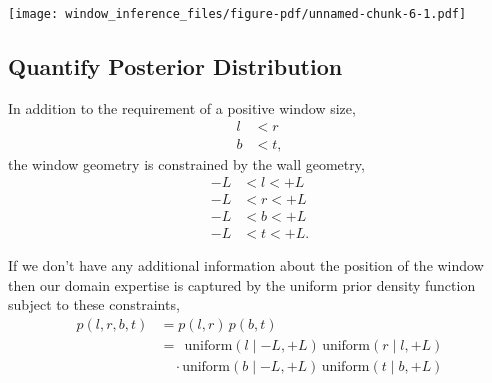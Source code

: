 \documentclass[
  letterpaper,
  DIV=11,
  numbers=noendperiod]{scrartcl}
\newenvironment{Shaded}{\begin{snugshade}}{\end{snugshade}}
\newcommand{\AttributeTok}[1]{\textcolor[rgb]{0.40,0.45,0.13}{#1}}
\newcommand{\ConstantTok}[1]{\textcolor[rgb]{0.56,0.35,0.01}{#1}}
\newcommand{\DecValTok}[1]{\textcolor[rgb]{0.68,0.00,0.00}{#1}}
\newcommand{\FunctionTok}[1]{\textcolor[rgb]{0.28,0.35,0.67}{#1}}
\newcommand{\NormalTok}[1]{\textcolor[rgb]{0.00,0.23,0.31}{#1}}
\newcommand{\OtherTok}[1]{\textcolor[rgb]{0.00,0.23,0.31}{#1}}
\newcommand{\SpecialCharTok}[1]{\textcolor[rgb]{0.37,0.37,0.37}{#1}}
\newcommand{\StringTok}[1]{\textcolor[rgb]{0.13,0.47,0.30}{#1}}
\begin{document}
\begin{Shaded}
\end{Shaded}

\texttt{[image: window\_inference\_files/figure-pdf/unnamed-chunk-6-1.pdf]}

\subsection{Quantify Posterior
Distribution}\label{quantify-posterior-distribution}

In addition to the requirement of a positive window size, \begin{align*}
l &< r
\\
b &< t,
\end{align*} the window geometry is constrained by the wall geometry,
\begin{align*}
-L &< l < +L
\\
-L &< r < +L
\\
-L &< b < +L
\\
-L &< t < +L.
\end{align*}

If we don't have any additional information about the position of the
window then our domain expertise is captured by the uniform prior
density function subject to these constraints, \begin{align*}
p(l, r, b, t)
&=
p(l, r) \, p(b, t)
\\
&=\;\,
\text{uniform}(l \mid -L, +L) \, \text{uniform}(r \mid l, +L)
\\
&\quad \cdot
\text{uniform}(b \mid -L, +L) \, \text{uniform}(t \mid b, +L)
\end{align*}
\end{document}
